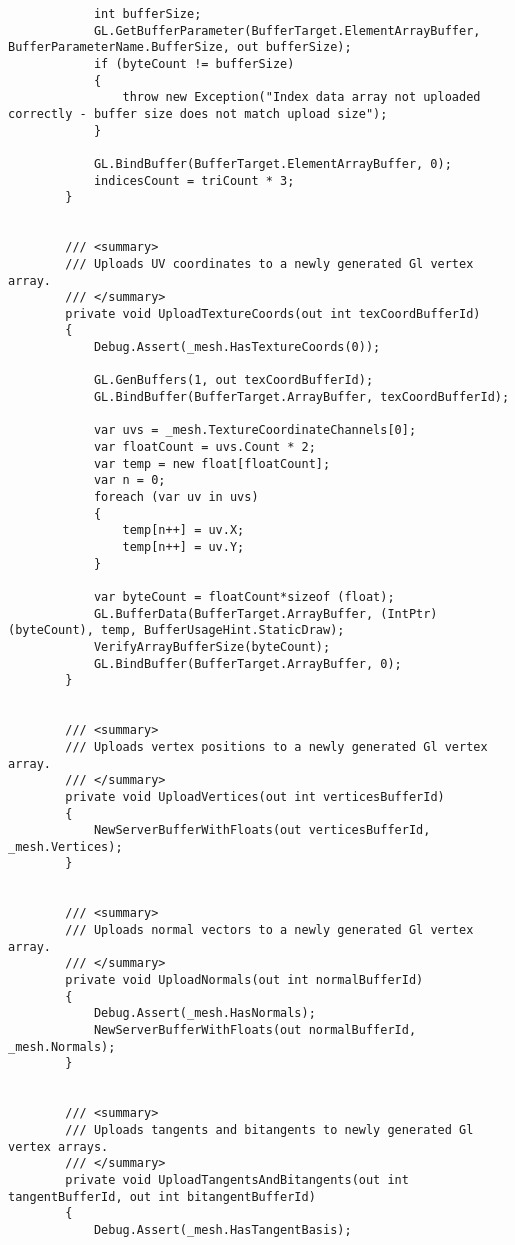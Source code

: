 \begin{scriptsize}
\begin{verbatim}
            int bufferSize;
            GL.GetBufferParameter(BufferTarget.ElementArrayBuffer, BufferParameterName.BufferSize, out bufferSize);
            if (byteCount != bufferSize)
            {
                throw new Exception("Index data array not uploaded correctly - buffer size does not match upload size");
            }

            GL.BindBuffer(BufferTarget.ElementArrayBuffer, 0);
            indicesCount = triCount * 3;
        }


        /// <summary>
        /// Uploads UV coordinates to a newly generated Gl vertex array.
        /// </summary>
        private void UploadTextureCoords(out int texCoordBufferId)
        {
            Debug.Assert(_mesh.HasTextureCoords(0));

            GL.GenBuffers(1, out texCoordBufferId);
            GL.BindBuffer(BufferTarget.ArrayBuffer, texCoordBufferId);

            var uvs = _mesh.TextureCoordinateChannels[0];
            var floatCount = uvs.Count * 2;
            var temp = new float[floatCount];
            var n = 0;
            foreach (var uv in uvs)
            {
                temp[n++] = uv.X;
                temp[n++] = uv.Y;
            }

            var byteCount = floatCount*sizeof (float);
            GL.BufferData(BufferTarget.ArrayBuffer, (IntPtr)(byteCount), temp, BufferUsageHint.StaticDraw);
            VerifyArrayBufferSize(byteCount);
            GL.BindBuffer(BufferTarget.ArrayBuffer, 0);
        }


        /// <summary>
        /// Uploads vertex positions to a newly generated Gl vertex array.
        /// </summary>
        private void UploadVertices(out int verticesBufferId)
        {
            NewServerBufferWithFloats(out verticesBufferId, _mesh.Vertices);
        }


        /// <summary>
        /// Uploads normal vectors to a newly generated Gl vertex array.
        /// </summary>
        private void UploadNormals(out int normalBufferId)
        {
            Debug.Assert(_mesh.HasNormals);
            NewServerBufferWithFloats(out normalBufferId, _mesh.Normals);
        }


        /// <summary>
        /// Uploads tangents and bitangents to newly generated Gl vertex arrays.
        /// </summary>
        private void UploadTangentsAndBitangents(out int tangentBufferId, out int bitangentBufferId)
        {
            Debug.Assert(_mesh.HasTangentBasis);


\end{verbatim}
\end{scriptsize}
